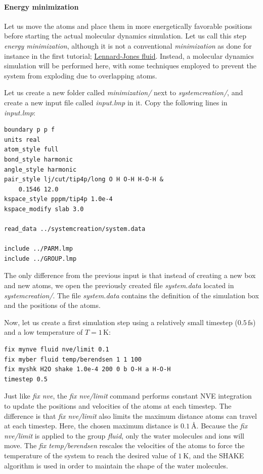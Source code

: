 \documentclass[9pt,tutorial]{livecoms}
\begin{document}
\paragraph{Energy minimization}
Let us move the atoms and place them in more energetically favorable positions
before starting the actual molecular dynamics simulation. Let us call this step
\textit{energy minimization}, although it is not a conventional \textit{minimization}
as done for instance in the first tutorial; \hyperref[lennard-jones-label]{Lennard-Jones fluid}.
Instead, a molecular dynamics simulation will be performed here, with some techniques
employed to prevent the system from exploding due to overlapping atoms.

Let us create a new folder called \textit{minimization/} next to \textit{systemcreation/},
and create a new input file called \textit{input.lmp} in it. Copy the following lines
in \textit{input.lmp}:
{\normalsize \begin{verbatim}
boundary p p f
units real
atom_style full
bond_style harmonic
angle_style harmonic
pair_style lj/cut/tip4p/long O H O-H H-O-H &
    0.1546 12.0
kspace_style pppm/tip4p 1.0e-4
kspace_modify slab 3.0

read_data ../systemcreation/system.data

include ../PARM.lmp
include ../GROUP.lmp
\end{verbatim}}
The only difference from the previous input is that instead of creating a new
box and new atoms, we open the previously created file \textit{system.data}
located in \textit{systemcreation/}. The file \textit{system.data} contains the
definition of the simulation box and the positions of the atoms.

Now, let us create a first simulation step using a relatively small
timestep ($0.5\,\text{fs}$) and a low temperature of $T = 1\,\text{K}$:
{\normalsize \begin{verbatim}
fix mynve fluid nve/limit 0.1
fix myber fluid temp/berendsen 1 1 100
fix myshk H2O shake 1.0e-4 200 0 b O-H a H-O-H
timestep 0.5
\end{verbatim}}
Just like \textit{fix nve}, the \textit{fix nve/limit} command performs constant
NVE integration to update the positions and velocities of the atoms at each
timestep. The difference is that \textit{fix nve/limit} also limits the maximum
distance atoms can travel at each timestep. Here, the chosen maximum distance
is $0.1~\text{\AA{}}$. Because the \textit{fix nve/limit} is applied to the
group \textit{fluid}, only the water molecules and ions will move.
The \textit{fix temp/berendsen} rescales the velocities of the atoms to
force the temperature of the system to reach the desired value of $1~\text{K}$,
and the SHAKE algorithm is used in order to maintain the shape of the water molecules.
\end{document}
